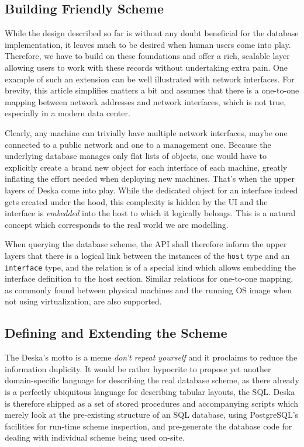\documentclass[a4paper]{jpconf}
\begin{document}
\subsection{Building Friendly Scheme}

While the design described so far is without any doubt beneficial for the database implementation, it leaves much to be desired when
human users come into play.  Therefore, we have to build on these foundations and offer a rich, scalable layer allowing users to work
with these records without undertaking extra pain.  One example of such an extension can be well illustrated with network interfaces.
For brevity, this article simplifies matters a bit and assumes that there is a one-to-one mapping between network addresses and network
interfaces, which is not true, especially in a modern data center.

Clearly, any machine can trivially have multiple network interfaces, maybe one connected to a public network and one to a management
one.  Because the underlying database manages only flat lists of objects, one would have to explicitly create a brand new object for
each interface of each machine, greatly inflating the effort needed when deploying new machines.  That's when the upper layers of Deska
come into play.  While the dedicated object for an interface indeed gets created under the hood, this complexity is hidden by the UI and the interface
is {\em embedded} into the host to which it logically belongs.  This is a natural concept which corresponds to the real world we are
modelling.

When querying the database scheme, the API shall therefore inform the upper layers that there is a logical link between the instances
of the {\tt host} type and an {\tt interface} type, and the relation is of a special kind which allows embedding the interface
definition to the host section.  Similar relations for one-to-one mapping, as commonly found between physical machines and the running
OS image when not using virtualization, are also supported.

\subsection{Defining and Extending the Scheme}

The Deska's motto is a meme {\em don't repeat yourself} and it proclaims to reduce the information duplicity.  It would be rather
hypocrite to propose yet another domain-specific language for describing the real database scheme, as there already is a perfectly
ubiquitous language for describing tabular layouts, the SQL.  Deska is therefore shipped as a set of stored procedures and accompanying
scripts which merely look at the pre-existing structure of an SQL database, using PostgreSQL's facilities for run-time scheme inspection,
and pre-generate the database code for dealing with individual scheme being used on-site.
\end{document}
